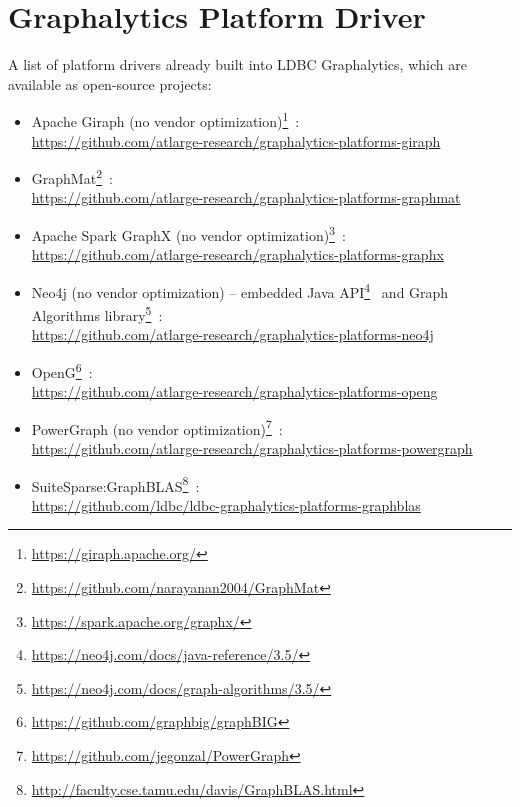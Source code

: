 \section{Graphalytics Platform Driver}\label{sec:instructions:drivers}
A list of platform drivers already built into LDBC Graphalytics, which are available as open-source projects:

\begin{itemize}
	\item Apache Giraph (no vendor optimization)\footnote{\url{https://giraph.apache.org/}}~\cite{DBLP:books/sp/SOAK2016}: \\ \url{https://github.com/atlarge-research/graphalytics-platforms-giraph}
	\item GraphMat\footnote{\url{https://github.com/narayanan2004/GraphMat}}~\cite{DBLP:journals/pvldb/SundaramSPDAV0D15}: \\ \url{https://github.com/atlarge-research/graphalytics-platforms-graphmat}
	\item Apache Spark GraphX (no vendor optimization)\footnote{\url{https://spark.apache.org/graphx/}}~\cite{DBLP:conf/sigmod/XinGFS13}: \\ \url{https://github.com/atlarge-research/graphalytics-platforms-graphx}
	\item Neo4j (no vendor optimization) --
	embedded Java API\footnote{\url{https://neo4j.com/docs/java-reference/3.5/}}~\cite{GraphDatabases} and
	Graph Algorithms library\footnote{\url{https://neo4j.com/docs/graph-algorithms/3.5/}}~\cite{	graph_algorithms_book}: \\ \url{https://github.com/atlarge-research/graphalytics-platforms-neo4j}
	\item OpenG\footnote{\url{https://github.com/graphbig/graphBIG}}~\cite{DBLP:conf/sc/NaiXTKL15}: \\ \url{https://github.com/atlarge-research/graphalytics-platforms-openg}
	\item PowerGraph (no vendor optimization)\footnote{\url{https://github.com/jegonzal/PowerGraph}}~\cite{DBLP:conf/osdi/GonzalezXDCFS14}: \\ \url{https://github.com/atlarge-research/graphalytics-platforms-powergraph}
	\item SuiteSparse:GraphBLAS\footnote{\url{http://faculty.cse.tamu.edu/davis/GraphBLAS.html}}~\cite{DBLP:journals/toms/Davis19}: \\ \url{https://github.com/ldbc/ldbc-graphalytics-platforms-graphblas}
\end{itemize}

